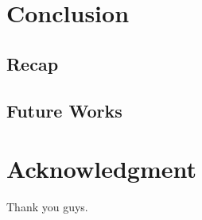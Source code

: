 \documentclass[conference,a4paper]{IEEEtran}
\begin{document}
\section{Conclusion}

\subsection{Recap}

\subsection{Future Works}


\section*{Acknowledgment}

Thank you guys.






%
%


%
%
%
%
%
%
%
\end{document}
